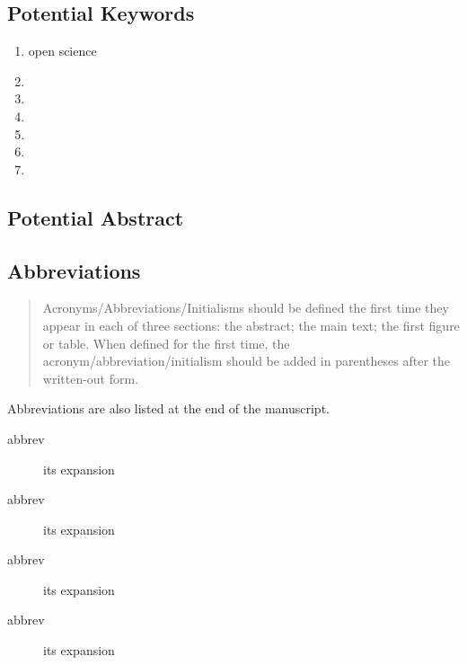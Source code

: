 \documentclass[11pt,letterpaper]{article}
\begin{document}
\subsection{Potential Keywords}
\label{sec:org2ec1441}

\begin{enumerate}
\item open science
\item 

\item 

\item 

\item 

\item 

\item 
\end{enumerate}



\subsection{Potential Abstract}
\label{sec:orgf0d7b66}


\subsection{Abbreviations}
\label{sec:orgb4e13db}

\begin{quote}
Acronyms/Abbreviations/Initialisms should be defined the first time they
appear in each of three sections: the abstract; the main text; the first
figure or table. When defined for the first time, the
acronym/abbreviation/initialism should be added in parentheses after the
written-out form.
\end{quote}

Abbreviations are also listed at the end of the manuscript.

\begin{description}
\item[{abbrev}] its expansion

\item[{abbrev}] its expansion

\item[{abbrev}] its expansion

\item[{abbrev}] its expansion
\end{description}
\end{document}
